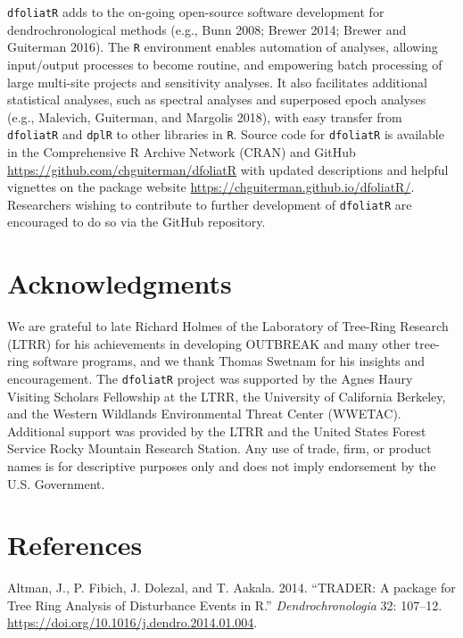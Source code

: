 \documentclass[review]{elsarticle} %
\begin{document}
\texttt{dfoliatR} adds to the on-going open-source software development for dendrochronological methods (e.g., Bunn 2008; Brewer 2014; Brewer and Guiterman 2016). The \texttt{R} environment enables automation of analyses, allowing input/output processes to become routine, and empowering batch processing of large multi-site projects and sensitivity analyses. It also facilitates additional statistical analyses, such as spectral analyses and superposed epoch analyses (e.g., Malevich, Guiterman, and Margolis 2018), with easy transfer from \texttt{dfoliatR} and \texttt{dplR} to other libraries in \texttt{R}. Source code for \texttt{dfoliatR} is available in the Comprehensive R Archive Network (CRAN) and GitHub \url{https://github.com/chguiterman/dfoliatR} with updated descriptions and helpful vignettes on the package website \url{https://chguiterman.github.io/dfoliatR/}. Researchers wishing to contribute to further development of \texttt{dfoliatR} are encouraged to do so via the GitHub repository.

\hypertarget{acknowledgments}{%
\section*{Acknowledgments}\label{acknowledgments}}

We are grateful to late Richard Holmes of the Laboratory of Tree-Ring Research (LTRR) for his achievements in developing OUTBREAK and many other tree-ring software programs, and we thank Thomas Swetnam for his insights and encouragement. The \texttt{dfoliatR} project was supported by the Agnes Haury Visiting Scholars Fellowship at the LTRR, the University of California Berkeley, and the Western Wildlands Environmental Threat Center (WWETAC). Additional support was provided by the LTRR and the United States Forest Service Rocky Mountain Research Station. Any use of trade, firm, or product names is for descriptive purposes only and does not imply endorsement by the U.S. Government.

\hypertarget{references}{%
\section*{References}\label{references}}

\hypertarget{refs}{}
\leavevmode\hypertarget{ref-Altman2014}{}%
Altman, J., P. Fibich, J. Dolezal, and T. Aakala. 2014. ``TRADER: A package for Tree Ring Analysis of Disturbance Events in R.'' \emph{Dendrochronologia} 32: 107--12. \url{https://doi.org/10.1016/j.dendro.2014.01.004}.
\end{document}
